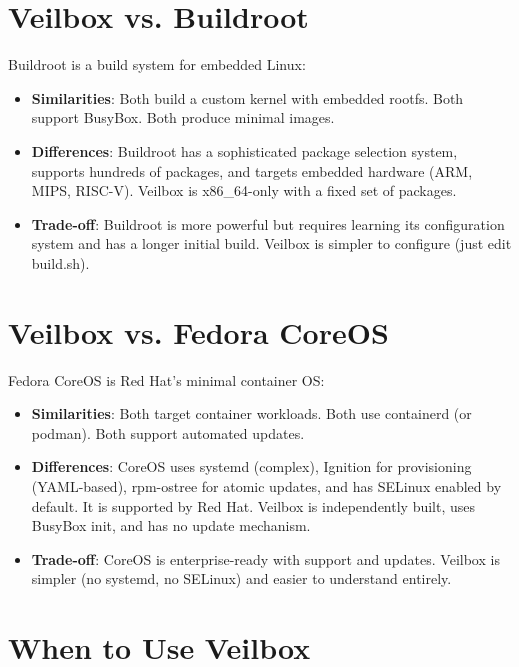 \section{Veilbox vs. Buildroot}

Buildroot is a build system for embedded Linux:

\begin{itemize}[nosep]
  \item \textbf{Similarities}: Both build a custom kernel with embedded
        rootfs. Both support BusyBox. Both produce minimal images.
  \item \textbf{Differences}: Buildroot has a sophisticated package selection
        system, supports hundreds of packages, and targets embedded
        hardware (ARM, MIPS, RISC-V). Veilbox is x86\_64-only with a
        fixed set of packages.
  \item \textbf{Trade-off}: Buildroot is more powerful but requires learning
        its configuration system and has a longer initial build.
        Veilbox is simpler to configure (just edit build.sh).
\end{itemize}

\section{Veilbox vs. Fedora CoreOS}

Fedora CoreOS is Red Hat's minimal container OS:

\begin{itemize}[nosep]
  \item \textbf{Similarities}: Both target container workloads. Both use
        containerd (or podman). Both support automated updates.
  \item \textbf{Differences}: CoreOS uses systemd (complex), Ignition for
        provisioning (YAML-based), rpm-ostree for atomic updates, and
        has SELinux enabled by default. It is supported by Red Hat.
        Veilbox is independently built, uses BusyBox init, and has no
        update mechanism.
  \item \textbf{Trade-off}: CoreOS is enterprise-ready with support and
        updates. Veilbox is simpler (no systemd, no SELinux) and easier
        to understand entirely.
\end{itemize}

\section{When to Use Veilbox}

